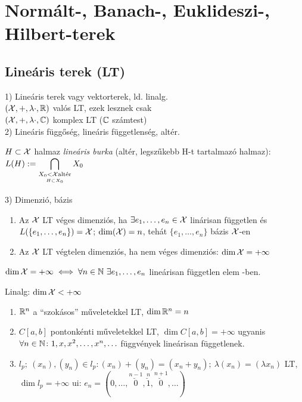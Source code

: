 \newpage
\section{Normált-, Banach-, Euklideszi-, Hilbert-terek}
\subsection{Lineáris terek (LT)}
1) Lineáris terek vagy vektorterek, ld. linalg.\\
$(\mathcal{X}, +, \lambda\cdot,\mathbb{R})$ valós  LT, ezek lesznek csak\\
$(\mathcal{X}, +, \lambda\cdot,\mathbb{C})$ komplex LT ($\mathbb{C}$ számtest)\\
2) Lineáris függőség, lineáris függetlenség, altér.

\begin{de}
  $H \subset \mathcal{X}$ halmaz \emph{lineáris burka} (altér, legszűkebb H-t
  tartalmazó halmaz):
  $\displaystyle L(H) := \bigcap_{\underset{H\subset X_0}{X_0 < \mathcal{X} \text{altér}}} X_0$
\end{de}
3) Dimenzió, bázis

\begin{de}
  \begin{enumerate}[\quad(a)]
  \item Az $\mathcal{X}$ LT véges dimenziós, ha $\exists  e_1,\ldots,e_n\in \mathcal{X}$
    linárisan független és $L(\{e_1,\ldots,e_n\})=\mathcal{X}$; $\dim(\mathcal{X}) = n$, tehát
    $\{e_1,\ldots,e_n\}$ bázis $\mathcal{X}$-en
  \item Az $\mathcal{X}$ LT végtelen dimenziós, ha nem véges dimenziós: $\dim\mathcal{X}
    = +\infty$
  \end{enumerate}
\end{de}

\begin{Megj}
\item $\dim\X=+\infty \ekviv \forall n\in\N\ \exists
  e_1,\ldots,e_n$ lineárisan független elem \X-ben.
\item Linalg: $\dim \mathcal{X} < +\infty$
\end{Megj}

\begin{pl}
  \begin{enumerate}
  \item $\mathbb{R}^n$ a ``szokásos'' műveletekkel LT, $\dim \mathbb{R}^n=n$
  \item $C[a,b]$ pontonkénti műveletekkel LT, $\dim C[a,b] = +
    \infty$  ugyanis $\forall n\in \mathbb{N}\colon 1,x,x^2,\ldots,x^n,
    \ldots$ függvények lineárisan függetlenek.
  \item $l_p;\ (x_n),(y_n)\in l_p\colon (x_n)+(y_n) = (x_n+y_n);\
    \lambda(x_n)=(\lambda x_n)$ LT, $\dim l_p=+\infty$ ui:
    $e_n=(0,\ldots,\overset{n-1}{\breve{0}},\overset{n}{\breve{1}},
    \overset{n+1}{\breve{0}},\ldots)$   
  \end{enumerate}
\end{pl}

